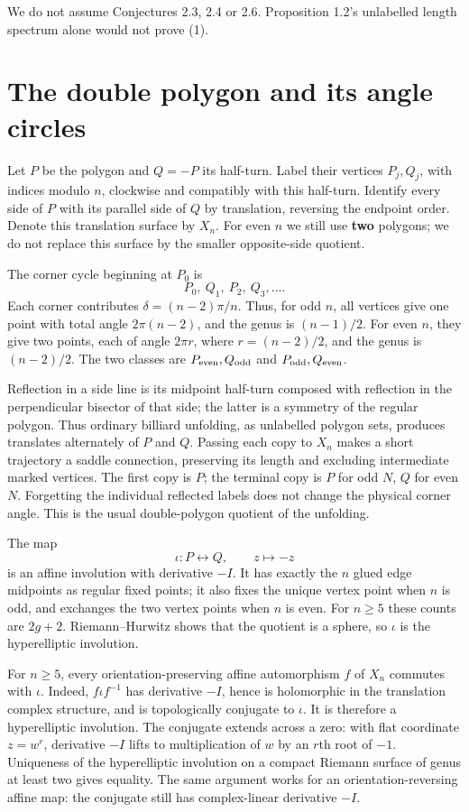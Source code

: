 \documentclass[11pt]{article}
\begin{document}
We do not assume Conjectures 2.3, 2.4 or 2.6. Proposition 1.2's unlabelled length spectrum alone would not prove (1).

\section{The double polygon and its angle circles}

Let \(P\) be the polygon and \(Q=-P\) its half-turn. Label their vertices \(P_j,Q_j\), with indices modulo \(n\), clockwise and compatibly with this half-turn. Identify every side of \(P\) with its parallel side of \(Q\) by translation, reversing the endpoint order. Denote this translation surface by \(X_n\). For even \(n\) we still use \textbf{two} polygons; we do not replace this surface by the smaller opposite-side quotient.

The corner cycle beginning at \(P_0\) is
\[
P_0,\ Q_1,\ P_2,\ Q_3,\ldots .
\tag{3}
\]
Each corner contributes \(\delta=(n-2)\pi/n\). Thus, for odd \(n\), all vertices give one point with total angle \(2\pi(n-2)\), and the genus is \((n-1)/2\). For even \(n\), they give two points, each of angle \(2\pi r\), where \(r=(n-2)/2\), and the genus is \((n-2)/2\). The two classes are \(P_{\rm even},Q_{\rm odd}\) and \(P_{\rm odd},Q_{\rm even}\).

Reflection in a side line is its midpoint half-turn composed with reflection in the perpendicular bisector of that side; the latter is a symmetry of the regular polygon. Thus ordinary billiard unfolding, as unlabelled polygon sets, produces translates alternately of \(P\) and \(Q\). Passing each copy to \(X_n\) makes a short trajectory a saddle connection, preserving its length and excluding intermediate marked vertices. The first copy is \(P\); the terminal copy is \(P\) for odd \(N\), \(Q\) for even \(N\). Forgetting the individual reflected labels does not change the physical corner angle. This is the usual double-polygon quotient of the unfolding.

The map
\[
\iota:P\longleftrightarrow Q,\qquad z\longmapsto-z
\tag{4}
\]
is an affine involution with derivative \(-I\). It has exactly the \(n\) glued edge midpoints as regular fixed points; it also fixes the unique vertex point when \(n\) is odd, and exchanges the two vertex points when \(n\) is even. For \(n\ge5\) these counts are \(2g+2\). Riemann--Hurwitz shows that the quotient is a sphere, so \(\iota\) is the hyperelliptic involution.

For \(n\ge5\), every orientation-preserving affine automorphism \(f\) of \(X_n\) commutes with \(\iota\). Indeed, \(f\iota f^{-1}\) has derivative \(-I\), hence is holomorphic in the translation complex structure, and is topologically conjugate to \(\iota\). It is therefore a hyperelliptic involution. The conjugate extends across a zero: with flat coordinate \(z=w^r\), derivative \(-I\) lifts to multiplication of \(w\) by an \(r\)th root of \(-1\). Uniqueness of the hyperelliptic involution on a compact Riemann surface of genus at least two gives equality. The same argument works for an orientation-reversing affine map: the conjugate still has complex-linear derivative \(-I\).
\end{document}
